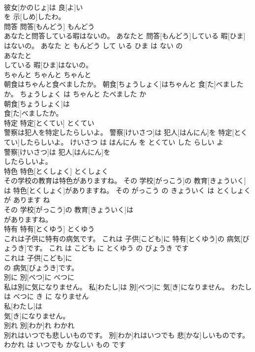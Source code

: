 \documentclass[8pt]{extreport}
\begin{document}
\begin{CJK}{UTF8}{min}
\\	彼女[かのじょ]は 良[よ]い
\\	を 示[しめ]したわ。			
\\	問答	問答[もんどう]	もんどう	
\\	あなたと問答している暇はないの。	あなたと 問答[もんどう]している 暇[ひま]はないの。	あなた と もんどう して いる ひま は ない の	
\\	あなたと
\\	している 暇[ひま]はないの。			
\\	ちゃんと	ちゃんと	ちゃんと	
\\	朝食はちゃんと食べましたか。	朝食[ちょうしょく]はちゃんと 食[た]べましたか。	ちょうしょく は ちゃんと たべました か	
\\	朝食[ちょうしょく]は
\\	食[た]べましたか。			
\\	特定	特定[とくてい]	とくてい	
\\	警察は犯人を特定したらしいよ。	警察[けいさつ]は 犯人[はんにん]を 特定[とくてい]したらしいよ。	けいさつ は はんにん を とくてい した らしい よ	
\\	警察[けいさつ]は 犯人[はんにん]を
\\	したらしいよ。			
\\	特色	特色[とくしょく]	とくしょく	
\\	その学校の教育は特色がありますね。	その 学校[がっこう]の 教育[きょういく]は 特色[とくしょく]がありますね。	その がっこう の きょういく は とくしょく が あります ね	
\\	その 学校[がっこう]の 教育[きょういく]は
\\	がありますね。			
\\	特有	特有[とくゆう]	とくゆう	
\\	これは子供に特有の病気です。	これは 子供[こども]に 特有[とくゆう]の 病気[びょうき]です。	これ は こども に とくゆう の びょうき です	
\\	これは 子供[こども]に
\\	の 病気[びょうき]です。			
\\	別に	別[べつ]に	べつに	
\\	私は別に気になりません。	私[わたし]は 別[べつ]に 気[き]になりません。	わたし は べつに き に なりません	
\\	私[わたし]は
\\	気[き]になりません。			
\\	別れ	別[わか]れ	わかれ	
\\	別れはいつでも悲しいものです。	別[わか]れはいつでも 悲[かな]しいものです。	わかれ は いつでも かなしい もの です	

\end{CJK}
\end{document}
